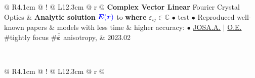 {{\begin{tabularx}{\linewidth}{@{} R{4.1cm} @{\phantom{di}} !{\vrule width1.0pt} @{\phantom{di}} L{12.3cm} @{\extracolsep{\fill}} r @{}}
	\textbf{Complex Vector Linear} \newline \vspace{-3pt} {\small Fourier Crystal Optics} & \textbf{Analytic solution} \colorbox{white}{\small $ {\color{blue} \boldsymbol{E} \! \left( \boldsymbol r \right)} $} to  \textbf{where} \colorbox{white}{$\varepsilon_{ij} \in \mathbb{C}$} \newline \vspace{3pt} $\bullet$ {\small test} \newline \vspace{-3pt} $\bullet$ {\small Reproduced well-known papers \& models with less time \& higher accuracy:} \newline \vspace{-3pt} \hspace{10pt} $\bullet$ {\small \href{https://opg.optica.org/josaa/abstract.cfm?uri=josaa-27-8-1828}{JOSA.A.} $|$ \href{https://opg.optica.org/oe/fulltext.cfm?uri=oe-17-20-17970}{O.E.} {\color{color-detail} \footnotesize \#tightly focus \#$\bar{\bar{\boldsymbol{\varepsilon}}}$ anisotropy}, } & 2023.02 \\ \Gap\Gap
\end{tabularx}
\\
\begin{tabularx}{\linewidth}{@{} R{4.1cm} @{\phantom{di}} !{\vrule width1.0pt} @{\phantom{di}} L{12.3cm} @{\extracolsep{\fill}} r @{}}

\end{tabularx}}}
